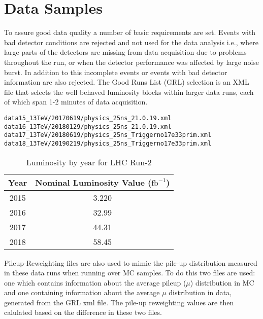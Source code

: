 \chapter{Data Samples}

To assure good data quality a number of basic requirements are set.  Events with bad detector conditions are rejected and not used for the data analysis i.e., where large parts of the detectors are missing from data acquisition due to problems throughout the run, or when the detector performance was affected by large noise burst.  In addition to this incomplete events or events with bad detector information are also rejected.  
The Good Runs List (GRL) selection is an XML file that selects the well behaved luminosity blocks within larger data runs, each of which span 1-2 minutes of data acquisition.
\begin{verbatim}
data15_13TeV/20170619/physics_25ns_21.0.19.xml 
data16_13TeV/20180129/physics_25ns_21.0.19.xml 
data17_13TeV/20180619/physics_25ns_Triggerno17e33prim.xml
data18_13TeV/20190219/physics_25ns_Triggerno17e33prim.xml
\end{verbatim}
\begin{table}[h]
\begin{center}
{\renewcommand{\arraystretch}{1.2}
\begin{tabular}{c|c}
\hline
 Year & Nominal Luminosity Value ($\text{fb}^{-1}$) \\ \hline 2015 & 3.220  \\
2016 & 32.99 \\
2017 & 44.31 \\
2018 & 58.45 \\ \hline
\end{tabular}
\caption{Luminosity by year for LHC Run-2 }
}
\end{center}
\end{table}

Pileup-Reweighting files are also used to mimic the pile-up distribution measured in these data runs when running over MC samples.  To do this two files are used: one which contains information about the average pileup ($\mu$) distribution in MC and one containing information about the average $\mu$ distribution in data, generated from the GRL xml file.  The pile-up reweighting values are then calulated based on the difference in these two files.
